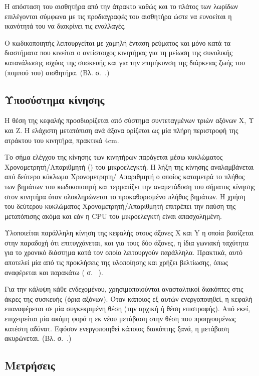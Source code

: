 Η απόσταση του αισθητήρα από την άτρακτο καθώς και το πλάτος των λωρίδων
επιλέγονται σύμφωνα με τις προδιαγραφές του αισθητήρα ώστε να ευνοείται η
ικανότητά του να διακρίνει τις εναλλαγές.

Ο κωδικοποιητής λειτουργείται με χαμηλή ένταση ρεύματος και μόνο κατά τα
διαστήματα που κινείται ο αντίστοιχος κινητήρας για τη μείωση της συνολικής
κατανάλωσης ισχύος της συσκευής και για την επιμήκυνση της διάρκειας ζωής του
(πομπού του) αισθητήρα. (Bλ.  σ.~\pageref{ch:encoder}.)


\subsection{Υποσύστημα κίνησης}

Η θέση της κεφαλής προσδιορίζεται από σύστημα συντεταγμένων τριών αξόνων X, Υ
και Z. Η ελάχιστη μετατόπιση ανά άξονα ορίζεται ως μία πλήρη περιστροφή της
ατράκτου του κινητήρα, πρακτικά 4cm.

Το σήμα ελέγχου της κίνησης των κινητήρων παράγεται μέσω κυκλώματος
Χρονομετρητή\slash{}Απαριθμητή () του μικροελεγκτή.
Η λήξη της κίνησης αναλαμβάνεται από δεύτερο κύκλωμα Χρονομετρητη\slash{}%
Απαριθμητή ο οποίος καταμετρά το πλήθος των βημάτων του κωδικοποιητή και
τερματίζει την αναμετάδοση του σήματος κίνησης στον κινητήρα όταν ολοκληρώνεται
το προκαθορισμένο πλήθος βημάτων. Η χρήση του δεύτερου κυκλώματος
Χρονομετρητή\slash{}Απαριθμητή επιτρέπει την παύση της μετατόπισης ακόμα και εάν
η CPU του μικροελεγκτή είναι απασχολημένη.

Υλοποιείται παράλληλη κίνηση της κεφαλής στους άξονες X και Y η οποία βασίζεται
στην παραδοχή ότι επιτυγχάνεται, και για τους δύο άξονες, η ίδια γωνιακή
ταχύτητα για το χρονικό διάστημα κατά τον οποίο λειτουργούν παράλληλα. Πρακτικά,
αυτό αποτελεί μία από τις προκλήσεις της υλοποίησης και χρήζει βελτίωσης, όπως
αναφέρεται και παρακάτω ( σ.~%
\pageref{sec:improvements}).

Για την κάλυψη κάθε ενδεχομένου, χρησιμοποιούνται ανασταλτικοί διακόπτες στις
άκρες της συσκευής (όρια αξόνων). Όταν κάποιος εξ αυτών ενεργοποιηθεί, η κεφαλή
επαναφέρεται σε μία συγκεκριμένη θέση (την αρχική ή θέση επιστροφής). Από εκεί,
επιχειρείται μία ακόμη φορά η εκ νέου μετάβαση στην θέση που προηγουμένως
κατέστη αδύνατ. Εφόσον ενεργοποιηθεί κάποιος διακόπτης ξανά, η μετάβαση
ακυρώνεται. (Bλ.  σ.~\pageref{ch:motor}.)


\subsection{Μετρήσεις}

